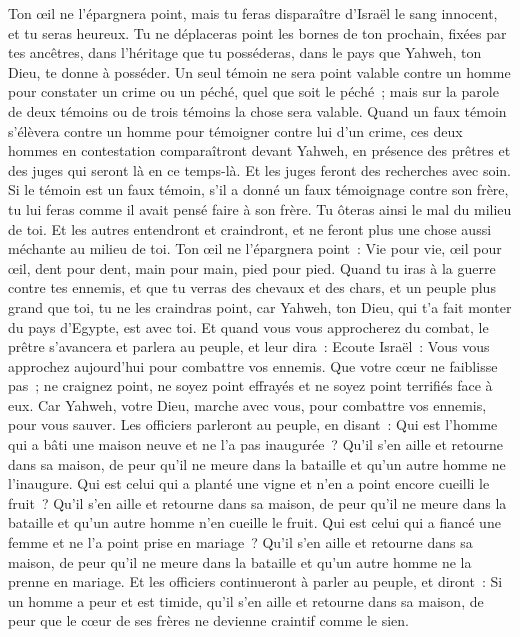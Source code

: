 \begin{multicols}{2}
Ton œil ne l'épargnera point, mais tu feras disparaître d'Israël le sang innocent, et tu seras heureux.
Tu ne déplaceras point les bornes de ton prochain, fixées par tes ancêtres, dans l'héritage que tu posséderas, dans le pays que Yahweh, ton Dieu, te donne à posséder.
Un seul témoin ne sera point valable contre un homme pour constater un crime ou un péché, quel que soit le péché~; mais sur la parole de deux témoins ou de trois témoins la chose sera valable.
Quand un faux témoin s'élèvera contre un homme pour témoigner contre lui d'un crime,
ces deux hommes en contestation comparaîtront devant Yahweh, en présence des prêtres et des juges qui seront là en ce temps-là.
Et les juges feront des recherches avec soin. Si le témoin est un faux témoin, s'il a donné un faux témoignage contre son frère,
tu lui feras comme il avait pensé faire à son frère. Tu ôteras ainsi le mal du milieu de toi.
Et les autres entendront et craindront, et ne feront plus une chose aussi méchante au milieu de toi.
Ton œil ne l'épargnera point~: Vie pour vie, œil pour œil, dent pour dent, main pour main, pied pour pied.
\VerseOne{}Quand tu iras à la guerre contre tes ennemis, et que tu verras des chevaux et des chars, et un peuple plus grand que toi, tu ne les craindras point, car Yahweh, ton Dieu, qui t'a fait monter du pays d'Egypte, est avec toi.
Et quand vous vous approcherez du combat, le prêtre s'avancera et parlera au peuple,
et leur dira~: Ecoute Israël~: Vous vous approchez aujourd'hui pour combattre vos ennemis. Que votre cœur ne faiblisse pas~; ne craignez point, ne soyez point effrayés et ne soyez point terrifiés face à eux.
Car Yahweh, votre Dieu, marche avec vous, pour combattre vos ennemis, pour vous sauver.
Les officiers parleront au peuple, en disant~: Qui est l'homme qui a bâti une maison neuve et ne l'a pas inaugurée~? Qu'il s'en aille et retourne dans sa maison, de peur qu'il ne meure dans la bataille et qu'un autre homme ne l'inaugure.
Qui est celui qui a planté une vigne et n'en a point encore cueilli le fruit~? Qu'il s'en aille et retourne dans sa maison, de peur qu'il ne meure dans la bataille et qu'un autre homme n'en cueille le fruit.
Qui est celui qui a fiancé une femme et ne l'a point prise en mariage~? Qu'il s'en aille et retourne dans sa maison, de peur qu'il ne meure dans la bataille et qu'un autre homme ne la prenne en mariage.
Et les officiers continueront à parler au peuple, et diront~: Si un homme a peur et est timide, qu'il s'en aille et retourne dans sa maison, de peur que le cœur de ses frères ne devienne craintif comme le sien.

\end{multicols}
